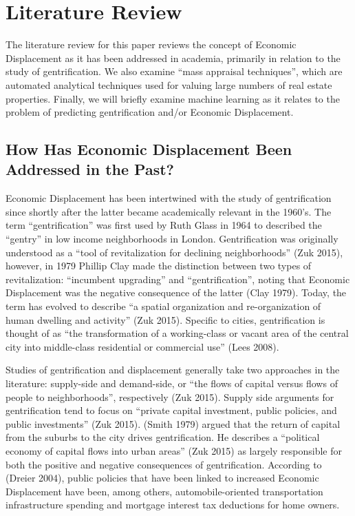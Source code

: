 \documentclass[12pt,]{article}
\begin{document}
\section{Literature Review}\label{literature-review}

The literature review for this paper reviews the concept of Economic
Displacement as it has been addressed in academia, primarily in relation
to the study of gentrification. We also examine ``mass appraisal
techniques'', which are automated analytical techniques used for valuing
large numbers of real estate properties. Finally, we will briefly
examine machine learning as it relates to the problem of predicting
gentrification and/or Economic Displacement.

\subsection{How Has Economic Displacement Been Addressed in the
Past?}\label{how-has-economic-displacement-been-addressed-in-the-past}

Economic Displacement has been intertwined with the study of
gentrification since shortly after the latter became academically
relevant in the 1960's. The term ``gentrification'' was first used by
Ruth Glass in 1964 to described the ``gentry'' in low income
neighborhoods in London. Gentrification was originally understood as a
``tool of revitalization for declining neighborhoods'' (Zuk 2015),
however, in 1979 Phillip Clay made the distinction between two types of
revitalization: ``incumbent upgrading'' and ``gentrification'', noting
that Economic Displacement was the negative consequence of the latter
(Clay 1979). Today, the term has evolved to describe ``a spatial
organization and re-organization of human dwelling and activity'' (Zuk
2015). Specific to cities, gentrification is thought of as ``the
transformation of a working-class or vacant area of the central city
into middle-class residential or commercial use'' (Lees 2008).

Studies of gentrification and displacement generally take two approaches
in the literature: supply-side and demand-side, or ``the flows of
capital versus flows of people to neighborhoods'', respectively (Zuk
2015). Supply side arguments for gentrification tend to focus on
``private capital investment, public policies, and public investments''
(Zuk 2015). (Smith 1979) argued that the return of capital from the
suburbs to the city drives gentrification. He describes a ``political
economy of capital flows into urban areas'' (Zuk 2015) as largely
responsible for both the positive and negative consequences of
gentrification. According to (Dreier 2004), public policies that have
been linked to increased Economic Displacement have been, among others,
automobile-oriented transportation infrastructure spending and mortgage
interest tax deductions for home owners.
\end{document}
